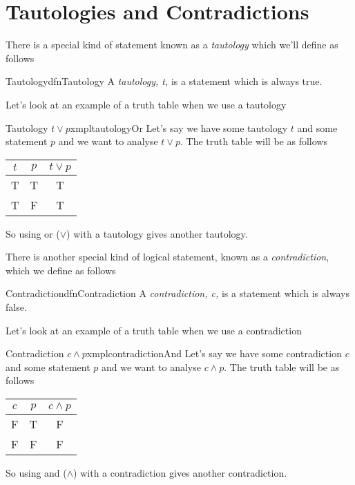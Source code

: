 \section{Tautologies and Contradictions}
There is a special kind of statement known as a \emph{tautology} which we'll define as follows

\begin{dfn}[label={def:tautology}]{Tautology}{dfnTautology}
    A \emph{tautology, t,} is a statement which is always true.
\end{dfn}

Let's look at an example of a truth table when we use a tautology

\begin{exmpl}[label={exmpl:tautologyOr}]{Tautology $t \lor p$}{xmpltautologyOr}
    Let's say we have some tautology $t$ and some statement $p$ and we want to analyse $t \lor p$. The truth table will be as follows
    \begin{center}
        \begin{tabular}{|c|c|c|}
            \hline
            $t$ & $p$ & $t \lor p$ \\
            \hline
            T   & T   & T          \\
            \hline
            T   & F   & T          \\
            \hline
        \end{tabular}
    \end{center}
    \vspace{0.5cm}
    So using or ($\lor$) with a tautology gives another tautology.
\end{exmpl}

There is another special kind of logical statement, known as a \emph{contradiction}, which we define as follows

\begin{dfn}[label={def:contradiction}]{Contradiction}{dfnContradiction}
    A \emph{contradiction, c,} is a statement which is always false.
\end{dfn}

Let's look at an example of a truth table when we use a contradiction

\begin{exmpl}[label={exmpl:contradictionAnd}]{Contradiction $c \land p$}{xmplcontradictionAnd}
    Let's say we have some contradiction $c$ and some statement $p$ and we want to analyse $c \land p$. The truth table will be as follows
    \begin{center}
        \begin{tabular}{|c|c|c|}
            \hline
            $c$ & $p$ & $c \land p$ \\
            \hline
            F   & T   & F           \\
            \hline
            F   & F   & F           \\
            \hline
        \end{tabular}
    \end{center}
    \vspace{0.5cm}
    So using and ($\land$) with a contradiction gives another contradiction.
\end{exmpl}


